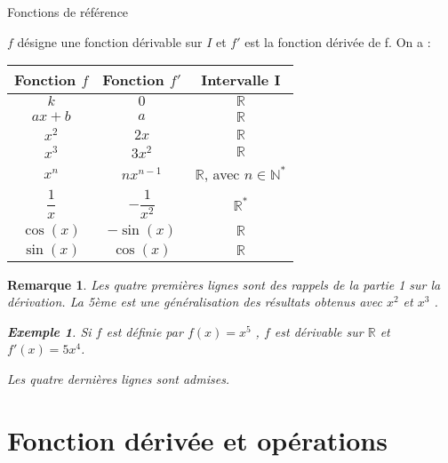 \documentclass[11pt,a4paper]{article}
\def\R{{\mathbb R}}
\def\N{{\mathbb N}}
\renewcommand{\arraystretch}{}
\theoremstyle{break}
\newtheorem{Rem}{Remarque}
\newtheorem{Ex}{Exemple}
\begin{document}
	\begin{bclogo}[couleur = yellow!30, arrondi = 0.1,logo=\bcbook]{Fonctions de référence}
	\begin{minipage}{0.9\textwidth}
	$f$ désigne une fonction dérivable sur $I$ et $f'$ est la fonction dérivée de f. On a : 
	\begin{center}
	\renewcommand{\arraystretch}{1.5}
	\begin{tabular}{|C{2.5}|C{2.5}|C{2.5}|}
	\hline 
	Fonction $f$ & Fonction $f'$ & Intervalle I \\ 
	\hline  
	$k$ & $0$ & $\R$ \\ 
	\hline  
	$ax+b$ & $a$ & $\R$ \\ 
	\hline
	$x^2$ & $2x$ & $\R$ \\ 
	\hline
	$x^3$ & $3x^2$ & $\R$ \\ 
	\hline
	$x^n$ & $n x^{n-1}$ & $\R$, avec $n\in\N^*$ \\
	\hline    
	\rule{0cm}{0.65cm}
	$\dfrac{1}{x}$ & $ -\dfrac{1}{x^2}$ & $\R^*$ \\ [0.2cm]
	\hline
	$\cos(x)$ & $ -\sin(x)$ & $\R$ \\
	\hline
	$\sin(x)$ & $\cos(x)$ & $\R$ \\
	\hline
	
	\end{tabular}
	\end{center}
	
	\end{minipage}
	
\end{bclogo}


\begin{Rem}
Les quatre premières lignes sont des rappels de la partie 1 sur la dérivation. La 5ème est une généralisation des résultats obtenus avec $x^2$ et $x^3$ .\\
\begin{Ex}
	Si $f$ est définie par $f(x)=x^5$ , $f$ est dérivable sur $\R$ et $f'(x)=5x^4$.
\end{Ex}
Les quatre dernières lignes sont admises.	
\end{Rem} 
\section{Fonction dérivée et opérations}
\end{document}
